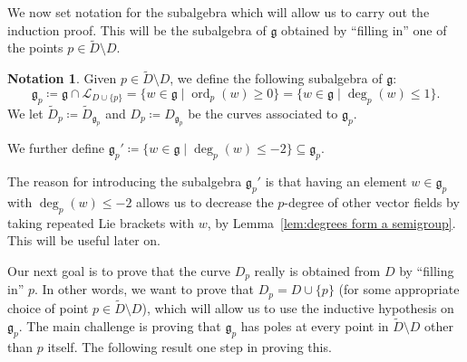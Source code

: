 \documentclass[12pt]{amsart}
\theoremstyle{plain}
\theoremstyle{definition}
\newtheorem{notation}[theorem]{Notation}
\numberwithin{equation}{section}
\def\g{\mathfrak{g}}
\def\L{\mathcal{L}}
\DeclareMathOperator{\ord}{ord}
\begin{document}
We now set notation for the subalgebra which will allow us to carry out the induction proof. This will be the subalgebra of $\g$ obtained by ``filling in'' one of the points $p \in \widetilde{D} \setminus D$.

\begin{notation}
    Given $p \in \widetilde{D} \setminus D$, we define the following subalgebra of $\g$:
    $$\g_p \coloneqq \g \cap \L_{D \cup \{p\}} = \{w \in \g \mid \ord_p(w) \geq 0\} = \{w \in \g \mid \deg_p(w) \leq 1\}.$$
    We let $\widetilde{D}_p \coloneqq \widetilde{D}_{\g_p}$ and $D_p \coloneqq D_{\g_p}$ be the curves associated to $\g_p$.
    
    We further define $\g_p' \coloneqq \{w \in \g \mid \deg_p(w) \leq -2\} \subseteq \g_p$.
\end{notation}

The reason for introducing the subalgebra $\g_p'$ is that having an element $w \in \g_p$ with $\deg_p(w) \leq -2$ allows us to decrease the $p$-degree of other vector fields by taking repeated Lie brackets with $w$, by Lemma~\ref{lem:degrees form a semigroup}. This will be useful later on.

Our next goal is to prove that the curve $D_p$ really is obtained from $D$ by ``filling in'' $p$. In other words, we want to prove that $D_p = D \cup \{p\}$ (for some appropriate choice of point $p \in \widetilde{D} \setminus D$), which will allow us to use the inductive hypothesis on $\g_p$. The main challenge is proving that $\g_p$ has poles at every point in $\widetilde{D} \setminus D$ other than $p$ itself. The following result one step in proving this.
\end{document}
